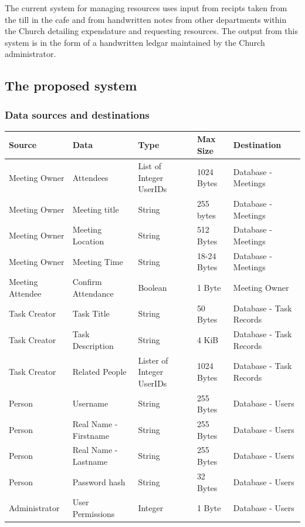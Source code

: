 The current system for managing resources uses input from recipts taken from the till in the cafe and from handwritten notes from 
other departments within the Church detailing expendature and requesting resources. The output from this system is in the form of a handwritten ledgar maintained by the Church administrator.

\subsection{The proposed system}

\subsubsection{Data sources and destinations}

\begin{table}[]
\centering
\label{my-label}
\begin{tabular}{|l|l|l|l|l|}
\hline
Source & Data & Type & Max Size & Destination \\ \hline
Meeting Owner & Attendees & List of Integer UserIDs & 1024 Bytes & Database - Meetings \\ \hline
Meeting Owner & Meeting title & String & 255 bytes & Database - Meetings \\ \hline
Meeting Owner & Meeting Location & String & 512 Bytes & Database - Meetings \\ \hline
Meeting Owner & Meeting Time & String & 18-24 Bytes & Database - Meetings \\ \hline
Meeting Attendee & Confirm Attendance & Boolean & 1 Byte & Meeting Owner \\ \hline
Task Creator & Task Title & String & 50 Bytes & Database - Task Records \\ \hline
Task Creator & Task Description & String & 4 KiB & Database - Task Records \\ \hline
Task Creator & Related People & Lister of Integer UserIDs & 1024 Bytes & Database - Task Records \\ \hline
Person & Username & String & 255 Bytes & Database - Users \\ \hline
Person & Real Name - Firstname & String & 255 Bytes & Database - Users \\ \hline
Person & Real Name - Lastname & String & 255 Bytes & Database - Users \\ \hline
Person & Password hash & String & 32 Bytes & Database - Users \\ \hline
Administrator & User Permissions & Integer & 1 Byte & Database - Users \\ \hline

\end{tabular}
\end{table}
